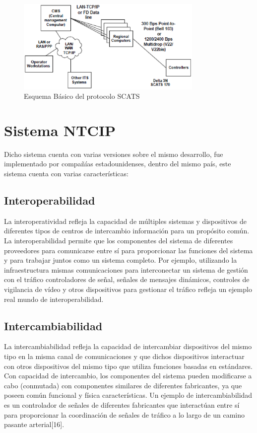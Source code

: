 \begin{figure}[h]
    \centering
    \includegraphics[width=0.8\textwidth]{ima/scat_php1eUteh}
    \caption{Esquema Básico del protocolo SCATS \cite{18}}
    \label{fig:mesh8}
\end{figure}
\section{Sistema NTCIP} 
Dicho sistema cuenta con varias versiones sobre el mismo desarrollo, fue implementado por compañías estadounidenses, dentro del mismo país, este sistema cuenta con varias características:
\subsection{Interoperabilidad}
La interoperatividad refleja la capacidad de múltiples sistemas y dispositivos de diferentes tipos de centros de intercambio información para un propósito común. La interoperabilidad permite que los componentes del sistema de diferentes  proveedores para comunicarse entre sí para proporcionar las funciones del sistema y para trabajar juntos como un sistema completo. Por ejemplo, utilizando la infraestructura mismas comunicaciones para interconectar un sistema de gestión con el tráfico controladores de señal, señales de mensajes dinámicos, controles de vigilancia de vídeo y otros dispositivos para gestionar el tráfico refleja un ejemplo real mundo de interoperabilidad.
\subsection{Intercambiabilidad}
La intercambiabilidad refleja la capacidad de intercambiar dispositivos del mismo tipo en la misma canal de comunicaciones y que dichos dispositivos interactuar con otros dispositivos del mismo tipo que utiliza funciones basadas en estándares. Con capacidad de intercambio, los componentes del sistema pueden modificarse a cabo (conmutada) con componentes similares de diferentes fabricantes, ya que poseen común funcional y física características. Un ejemplo de intercambiabilidad es un controlador de señales de diferentes fabricantes que interactúan entre sí para  proporcionar la coordinación de señales de tráfico a lo largo de un camino pasante arterial[16]. 
